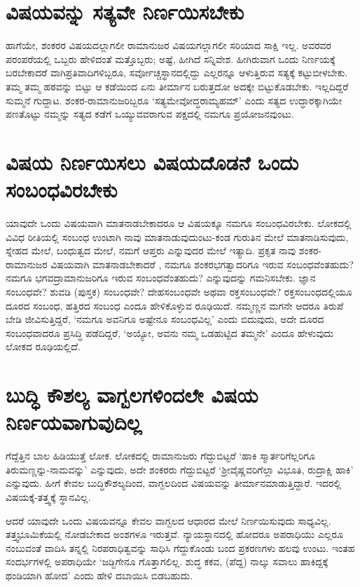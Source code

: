 \section*{ವಿಷಯವನ್ನು ಸತ್ಯವೇ ನಿರ್ಣಯಿಸಬೇಕು}

ಹಾಗೆಯೇ, ಶಂಕರರ ವಿಷಯದಲ್ಲಾಗಲೀ ರಾಮಾನುಜರ ವಿಷಯಗಲ್ಲಾಗಲೀ ಸರಿಯಾದ ಸಾಕ್ಷಿ ಇಲ್ಲ. ಅವರವರ ಪರಂಪರೆಯಲ್ಲಿ ಒಬ್ಬರು ಹೇಳಿದಂತೆ ಮತ್ತೊಬ್ಬರು; ಅಷ್ಟೆ, ಹೀಗಿದೆ ಸನ್ನಿವೇಶ. ಹೀಗಿರುವಾಗ ಒಂದು ನಿರ್ಣಯಕ್ಕೆ ಬರಬೇಕಾದರೆ ವಾಗಿಪ್ರತಿವಾದಿಗಳಿಬ್ಬರೂ, ಸರ್ವೋಚ್ಚಸ್ಥಾನದಲ್ಲಿದ್ದು ಎಲ್ಲರನ್ನೂ ಆಳುತ್ತಿರುವ ಸತ್ಯಕ್ಕೆ ಕಟ್ಟುಬೀಳಬೇಕು. ತಮ್ಮ ತಮ್ಮ ಹಠವನ್ನು ಬಿಟ್ಟು ಆ ಕಡೆಯಿಂದ ಏನು ತೀರ್ಮಾನ ಬರುತ್ತದೋ ಅದಕ್ಕೇ ಬಿಟ್ಟುಕೊಡಬೇಕು. ಇಲ್ಲದಿದ್ದರೆ ಸುಮ್ಮನೆ ಗುದ್ದಾಟ. ಶಂಕರ-ರಾಮಾನುಜರಿಬ್ಬರೂ `ಸತ್ಯಮೇವೋದ್ಧರಾಮ್ಯಹಮ್' ಎಂದು ಸತ್ಯದ ಉದ್ಧಾರಕ್ಕಾಗಿಯೇ ಪಣತೊಟ್ಟು ನಮ್ಮನ್ನು ಸತ್ಯದ ಕಡೆಗೆ ಒಯ್ಯುವವರಾಗುವ ಪಕ್ಷದಲ್ಲಿ ನಮಗೂ ಪ್ರಯೋಜನವುಂಟು.

\section*{ವಿಷಯ ನಿರ್ಣಯಿಸಲು ವಿಷಯದೊಡನೆ ಒಂದು ಸಂಬಂಧವಿರಬೇಕು}

ಯಾವುದೇ ಒಂದು ವಿಷಯವಾಗಿ ಮಾತನಾಡಬೇಕಾದರೂ ಆ ವಿಷಯಕ್ಕೂ ನಮಗೂ ಸಂಬಂಧವಿರಬೇಕು. ಲೋಕದಲ್ಲಿ ವಿವಿಧ ರೀತಿಯಲ್ಲಿ ಸಂಬಂಧ ಉಂಟಾಗಿ ನಾವು ಮಾತನಾಡುವುದುಂಟು-ಕಂಡ ಗುರುತಿನ ಮೇಲೆ ಮಾತನಾಡಿಸುವುದು, ಸ್ನೇಹದ ಮೇಲೆ, ಬಂಧುತ್ವದ ಮೇಲೆ, ನಮಗೆ ಆಪ್ತರು ಎನ್ನುವುದರ ಮೇಲೆ ಇತ್ಯಾದಿ. ಪ್ರಕೃತ ನಾವು ಶಂಕರ-ರಾಮಾನುಜರ ವಿಷಯವಾಗಿ ಮಾತನಾಡಬೇಕಾದರೆ , ನಮಗೂ ಶಂಕರಭಗತ್ವಾದರಿಗೂ ಇರುವ ಸಂಬಂಧವೆಂತಹುದು? ನಮಗೂ ಭಗವದ್ರಾಮಾನುಜರಿಗೂ ಇರುವ ಸಂಬಂಧವೆಂತಹುದು? ಎನ್ನುವುದನ್ನು ಗಮನಿಸಬೇಕು. ಜ್ಞಾನ ಸಂಬಂಧವೇ? ಶುವಡಿ (ಪುಸ್ತಕ) ಸಂಬಂಧವೇ? ದೇಹಸಂಬಂಧವೇ ಅಥವಾ ರಕ್ತಸಂಬಂಧವೇ? ರಕ್ತಸಂಬಂಧದಲ್ಲಿಯೂ ದೂರದ ಸಂಬಂಧ, ಹತ್ತಿರದ ಸಂಬಂಧ ಎಂದೂ ಹೇಳಿಕೊಳ್ಳುವ ರೂಢಿಯಿದೆ. ನಮ್ಮಣ್ಣನ ಮಗನೇ ಆದರೂ ತಿರುಪೆ ಬೇಡಿ ಜೀವಿಸುತ್ತಿದ್ದರೆ, `ನಮಗೂ ಅವನಿಗೂ ಅಷ್ಟೇನೂ ಸಂಬಂಧವಿಲ್ಲ' ಎಂದು ಬಿದುವುದು, ಅದೇ ದೂರದ ಸಂಬಂಧವಾದರೂ ಪ್ರಸಿದ್ಧಿ ಪಡೆದಿದ್ದರೆ, `ಅಯ್ಯೋ, ಅವನು ನಮ್ಮ ಒಡಹುಟ್ಟಿದ ತಮ್ಮನೇ' ಎಂದೂ ಹೇಳುವುದು ಲೋಕದ ರೂಢಿಯಲ್ಲಿದೆ.

\section*{ಬುದ್ಧಿ ಕೌಶಲ್ಯ ವಾಗ್ಬಲಗಳಿಂದಲೇ ವಿಷಯ ನಿರ್ಣಯವಾಗುವುದಿಲ್ಲ}

ಗೆದ್ದೆತ್ತಿನ ಬಾಲ ಹಿಡಿಯುತ್ತೆ ಲೋಕ. ಲೋಕದಲ್ಲಿ ರಾಮಾನುಜರು ಗೆದ್ದುಬಿಟ್ಟರೆ `ಹಾಕಿ ಸ್ಮಾರ್ತರಿಗೆಲ್ಲರಿಗೂ ತಿರುಮಣ್ಣನ್ನು-ನಾಮವನ್ನು' ಎನ್ನುವುದು, ಅದೇ ಶಂಕರರು ಗೆದ್ದುಬಿಟ್ಟರೆ `ಶ್ರೀವೈಷ್ಣವರಿಗೆಲ್ಲಾ ವಿಭೂತಿ, ರುದ್ರಾಕ್ಷಿ ಹಾಕಿ' ಎನ್ನುವುದು. ಹೀಗೆ ಕೇವಲ ಬುದ್ಧಿಕೌಶಲ್ಯದಿಂದ, ವಾಗ್ಬಲದಿಂದ ವಿಷಯವನ್ನು  ತೀರ್ಮಾನಮಾಡುತ್ತಿದ್ದಾರೆ. ಇದರಲ್ಲಿ ವಿಷಯಕ್ಕೆ-ತತ್ತ್ವಕ್ಕೆ ಸ್ಥಾನವಿಲ್ಲ.

ಆದರೆ ಯಾವುದೇ ಒಂದು ವಿಷಯವನ್ನೂ ಕೇವಲ ವಾಗ್ಬಲದ ಆಧಾರದ ಮೇಲೆ ನಿರ್ಣಯಿಸುವುದು ಸಾಧ್ಯವಿಲ್ಲ. ತತ್ತ್ವಭೂಮಿಕೆಯಲ್ಲಿ ನೋಡಬೇಕಾದ ಅಂಶಗಳೂ ಇರುತ್ತವೆ. ನ್ಯಾಯಸ್ಥಾನದಲ್ಲಿ ಹೋದರೂ ಅಪರಾಧಿಯು ಎಲ್ಲರೂ ನಂಬುವಂತೆ ವಾದಿಸಿ ತನ್ನಲ್ಲಿ ನಿರಪರಾಧಿತ್ವವನ್ನು ಸಾಧಿಸಿ ಗೆದ್ದುಕೊಂಡು ಬಂದ ಪ್ರಕರಣಗಳು ಹಲವು ಉಂಟು. ಇಂತಹ ಸಂದರ್ಭಗಳಲ್ಲಿ ಅಪರಾಧಿಯೇ `ಜಡ್ಜಿಗೇನೂ ಗೊತ್ತಾಗಲಿಲ್ಲ. ಶುದ್ಧ ಕಕವ, (ಪೆದ್ದ) ನಾಲ್ಕು ಸವಾಲು ಹಾಕಿದ್ದಕ್ಕೆ ಥಂಡಿಯಾಗಿ ಹೋದ' ಎಂದು ಹೇಳಿ ದಬಾಯಿಸಿ ಬಿಡಬಹುದು.

